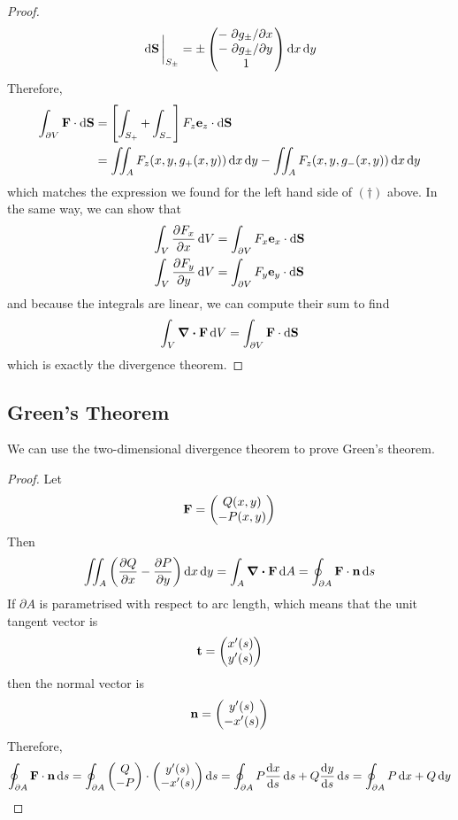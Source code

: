\documentclass{article}
\begin{document}
\begin{proof}
	\[ \eval{\dd{\vb S}}_{S_\pm} = \pm \begin{pmatrix}
			-\pdv*{g_\pm}{x} \\
			-\pdv*{g_\pm}{y} \\
			1                \\
		\end{pmatrix} \dd{x}\dd{y} \]
	Therefore,
	\begin{align*}
		\int_{\partial V} \vb F \cdot \dd{\vb S} & = \left[ \int_{S_+} + \int_{S_-} \right] F_z \vb e_z \cdot \dd{\vb S}                   \\
		                                         & = \iint_A F_z(x, y, g_+(x, y)) \dd{x}\dd{y} - \iint_A F_z(x, y, g_-(x, y)) \dd{x}\dd{y}
	\end{align*}
	which matches the expression we found for the left hand side of $(\dagger)$ above. In the same way, we can show that
	\begin{align*}
		\int_V \pdv{F_x}{x} \dd{V} & = \int_{\partial V} F_x \vb e_x \cdot \dd{\vb S} \\
		\int_V \pdv{F_y}{y} \dd{V} & = \int_{\partial V} F_y \vb e_y \cdot \dd{\vb S} \\
	\end{align*}
	and because the integrals are linear, we can compute their sum to find
	\[ \int_V \div{\vb F} \dd{V} = \int_{\partial V} \vb F \cdot \dd{\vb S} \]
	which is exactly the divergence theorem.
\end{proof}

\subsection{Green's Theorem}
We can use the two-dimensional divergence theorem to prove Green's theorem.
\begin{proof}
	Let
	\[ \vb F = \begin{pmatrix}
			Q(x, y) \\ -P(x, y)
		\end{pmatrix} \]
	Then
	\[ \iint_A \left( \pdv{Q}{x} - \pdv{P}{y} \right) \dd{x}\dd{y} = \int_A \div{\vb F} \dd{A} = \oint_{\partial A} \vb F \cdot \vb n \dd{s} \]
	If $\partial A$ is parametrised with respect to arc length, which means that the unit tangent vector is
	\[ \vb t = \begin{pmatrix}
			x'(s) \\ y'(s)
		\end{pmatrix} \]
	then the normal vector is
	\[ \vb n = \begin{pmatrix}
			y'(s) \\ -x'(s)
		\end{pmatrix} \]
	Therefore,
	\[ \oint_{\partial A} \vb F \cdot \vb n \dd{s} = \oint_{\partial A} \begin{pmatrix}
			Q \\ -P
		\end{pmatrix} \cdot \begin{pmatrix}
			y'(s) \\ -x'(s)
		\end{pmatrix} \dd{s} = \oint_{\partial A} P \dv{x}{s} \dd{s} + Q \dv{y}{s} \dd{s} = \oint_{\partial A} P \dd{x} + Q \dd{y} \]
\end{proof}
\end{document}
